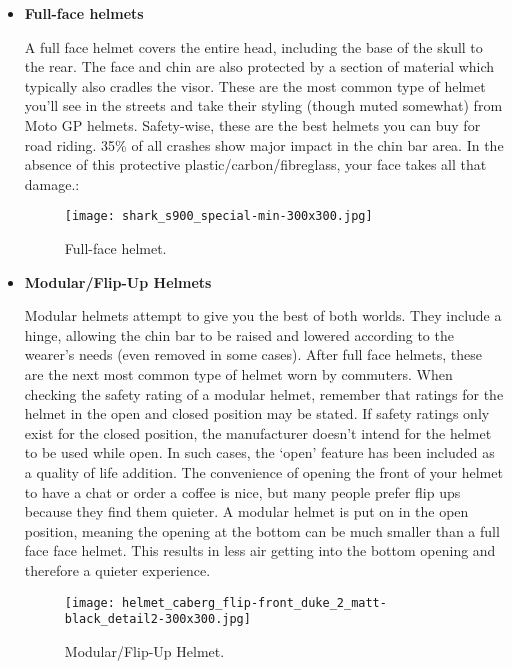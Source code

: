 \begin{itemize}	
	\item\textbf{Full-face helmets}\vspace{.1cm}
	
	A full face helmet covers the entire head, including the base of the skull to the rear. The face and chin are also protected by a section of material which typically also cradles the visor.	These are the most common type of helmet you’ll see in the streets and take their styling (though muted somewhat) from Moto GP helmets. Safety-wise, these are the best helmets you can buy for road riding. 35\% of all crashes show major impact in the chin bar area. In the absence of this protective plastic/carbon/fibreglass, your face takes all that damage.:\vspace{.2cm}
	
	\begin{figure}[h]
		\centering
		\texttt{[image: shark\_s900\_special-min-300x300.jpg]}
		\caption{Full-face helmet.}
	\end{figure}
	
	\item\textbf{Modular/Flip-Up Helmets} \vspace{.1cm}
	
	Modular helmets attempt to give you the best of both worlds. They include a hinge, allowing the chin bar to be raised and lowered according to the wearer’s needs (even removed in some cases). After full face helmets, these are the next most common type of helmet worn by commuters. When checking the safety rating of a modular helmet, remember that ratings for the helmet in the open and closed position may be stated. If safety ratings only exist for the closed position, the manufacturer doesn’t intend for the helmet to be used while open. In such cases, the ‘open’ feature has been included as a quality of life addition. The convenience of opening the front of your helmet to have a chat or order a coffee is nice, but many people prefer flip ups because they find them quieter. A modular helmet is put on in the open position, meaning the opening at the bottom can be much smaller than a full face face helmet. This results in less air getting into the bottom opening and therefore a quieter experience.
	\begin{figure}[h]
		\centering
		\texttt{[image: helmet\_caberg\_flip-front\_duke\_2\_matt-black\_detail2-300x300.jpg]}
		\caption{Modular/Flip-Up Helmet.}
	\end{figure}
	\pagebreak
	

\end{itemize}
